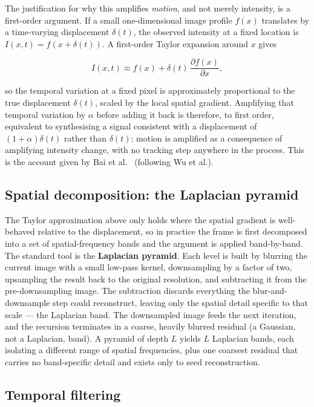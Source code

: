 The justification for why this amplifies \textit{motion}, and not merely intensity, is a first-order argument. If a small one-dimensional image profile $f(x)$ translates by a time-varying displacement $\delta(t)$, the observed intensity at a fixed location is $I(x,t) = f(x+\delta(t))$. A first-order Taylor expansion around $x$ gives

\[
	I(x,t) \approx f(x) + \delta(t)\,\frac{\partial f(x)}{\partial x},
\]

so the temporal variation at a fixed pixel is approximately proportional to the true displacement $\delta(t)$, scaled by the local spatial gradient. Amplifying that temporal variation by $\alpha$ before adding it back is therefore, to first order, equivalent to synthesising a signal consistent with a displacement of $(1+\alpha)\delta(t)$ rather than $\delta(t)$: motion is amplified as a consequence of amplifying intensity change, with no tracking step anywhere in the process. This is the account given by Bai et al.~\cite{bai2021} (following Wu et al.).

\subsection{Spatial decomposition: the Laplacian pyramid}
\label{sec:laplacian-pyramid}

The Taylor approximation above only holds where the spatial gradient is well-behaved relative to the displacement, so in practice the frame is first decomposed into a set of spatial-frequency bands and the argument is applied band-by-band. The standard tool is the \textbf{Laplacian pyramid}. Each level is built by blurring the current image with a small low-pass kernel, downsampling by a factor of two, upsampling the result back to the original resolution, and subtracting it from the pre-downsampling image. The subtraction discards everything the blur-and-downsample step could reconstruct, leaving only the spatial detail specific to that scale --- the Laplacian band. The downsampled image feeds the next iteration, and the recursion terminates in a coarse, heavily blurred residual (a Gaussian, not a Laplacian, band). A pyramid of depth $L$ yields $L$ Laplacian bands, each isolating a different range of spatial frequencies, plus one coarsest residual that carries no band-specific detail and exists only to seed reconstruction.

\subsection{Temporal filtering}
\label{sec:temporal-filtering}

